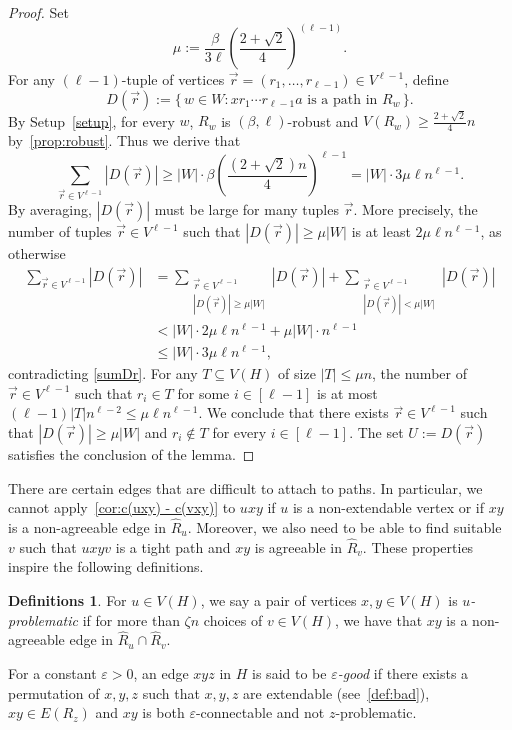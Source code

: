 \documentclass[A4paper,12pt]{article}
\theoremstyle{definition}
\newtheorem{defs}[thm]{Definitions}
\newcommand{\eps}{\varepsilon}
\begin{document}
\begin{proof}
Set 
\[
\mu:=  \frac{\beta}{3\ell} \left( \frac{2+\sqrt{2}}{4}\right)^{(\ell-1)}.
\] 
For any $(\ell-1)$-tuple of vertices $\vec{r} = (r_1, \dots, r_{\ell-1}) \in V^{\ell-1}$, define
\[
D(\vec{r}) := \{\, w \in W : x r_1 \cdots r_{\ell-1} a \text{ is a path in } R_{w} \,\}.
\]
By Setup~\ref{setup},  for every $w$, $R_w$ is $(\beta,\ell)$-robust and $V(R_w) \ge \frac{2+\sqrt{2}}{4}n$ by~\cref{prop:robust}. Thus we derive that 
\begin{equation}
\label{sumDr}
\sum_{\vec{r} \in V^{\ell-1}} |D(\vec{r})|
\geq |W|\cdot \beta \left(\frac{(2+\sqrt{2})n}{4}\right)^{\ell-1} = |W| \cdot 3 \mu\ell n^{\ell-1}.
\end{equation}
By averaging, $|D(\vec{r})|$ must be large for many tuples $\vec{r}$. More precisely, the number of tuples $\vec{r}\in V^{\ell-1}$ such that $|D(\vec{r})|\geq \mu|W| $ is at least $2\mu \ell n^{\ell-1}$, as otherwise
\begin{align*}
\sum_{\vec{r} \in V^{\ell-1}} |D(\vec{r})|&= \sum_{\substack{\vec{r} \in V^{\ell-1}\\ |D(\vec{r})|\geq \mu |W|}} |D(\vec{r})| + \sum_{\substack{\vec{r} \in V^{\ell-1}\\ |D(\vec{r})|< \mu|W|}} |D(\vec{r})|
\\ 
&< |W|\cdot 2\mu\ell  n^{\ell-1}+ \mu|W| \cdot n^{\ell-1} \\
&\leq |W|\cdot 3\mu\ell n^{\ell-1}, 
\end{align*}
contradicting \eqref{sumDr}.  For any $T\subseteq V(H)$ of size $|T|\leq \mu n$, the number of $\vec{r}\in V^{\ell-1}$ such that $r_i\in T$ for some $i\in[\ell-1]$ is at most $(\ell-1) |T|n^{\ell-2}\leq \mu\ell n^{\ell-1}$. We conclude that there exists $\vec{r}\in V^{\ell-1}$ such that $|D(\vec{r})|\geq \mu|W|$ and $r_i\notin T$ for every $i\in[\ell-1]$. The set $U:= D(\vec{r})$ satisfies the conclusion of the lemma.
\end{proof}

There are certain edges that are difficult to attach to paths. In particular, we cannot apply~\cref{cor:c(uxy) - c(vxy)} to $uxy$ if $u$ is a non-extendable vertex or if $xy$ is a non-agreeable edge in $\hat{R}_u$. Moreover, we also need to be able to find suitable $v$ such that $uxyv$ is a tight path and $xy$ is agreeable in $\hat{R}_v$. These properties inspire the following definitions.

\begin{defs}
    For $u \in V(H)$, we say a pair of vertices $x, y \in V(H)$ is \emph{$u$-problematic} if for more than $\zeta n$ choices of $v \in V(H)$, we have that $xy$ is a non-agreeable edge in $\hat{R}_{u}\cap \hat{R}_{v}$. 

\label{factprob}
    For a constant $\varepsilon > 0$, an edge $xyz$ in $H$ is said to be \emph{$\eps$-good} if there exists a permutation of $x,y,z$ such that $x,y,z$ are extendable (see~\cref{def:bad}), $xy\in E(R_{z})$ and $xy$ is both $\eps$-connectable 
    and not $z$-problematic.
\end{defs} 
\end{document}
